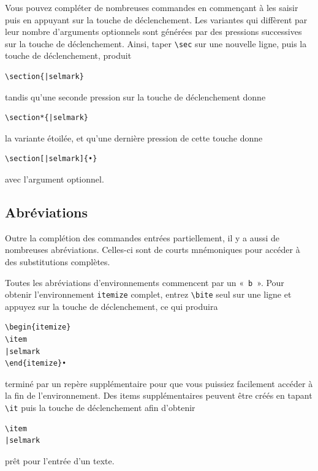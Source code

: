 \documentclass[11pt]{article}
\newcommand{\cmd}[1]{\texttt{#1}}
\begin{document}
Vous pouvez compléter de nombreuses commandes en commençant à les saisir puis en appuyant sur la touche de déclenchement. Les variantes qui diffèrent par leur nombre d’arguments optionnels sont générées par des pressions successives sur la touche de déclenchement. Ainsi, taper \verb|\sec| sur une nouvelle ligne, puis la touche de déclenchement, produit
\begin{verbatim}
\section{|selmark}
\end{verbatim}
tandis qu’une seconde pression sur la touche de déclenchement donne
\begin{verbatim}
\section*{|selmark}
\end{verbatim}
la variante étoilée, et qu’une dernière pression de cette touche donne
\begin{verbatim}
\section[|selmark]{•}
\end{verbatim}
avec l’argument optionnel.

\subsection*{Abréviations}

Outre la complétion des commandes entrées partiellement, il y a aussi de nombreuses abréviations. Celles-ci sont de courts mnémoniques pour accéder à des substitutions complètes.

Toutes les abréviations d’environnements commencent par un «~\texttt{b}~». Pour obtenir l’environnement \cmd{itemize} complet, entrez \verb|\bite| seul sur une ligne et appuyez sur la touche de déclenchement, ce qui produira
\begin{verbatim}
\begin{itemize}
\item
|selmark
\end{itemize}•
\end{verbatim}
terminé par un repère supplémentaire pour que vous puissiez facilement accéder à la fin de l’environnement. Des items supplémentaires peuvent être créés en tapant \verb|\it| puis la touche de déclenchement afin d’obtenir
\begin{verbatim}
\item
|selmark
\end{verbatim}
prêt pour l’entrée d’un texte.
\end{document}
